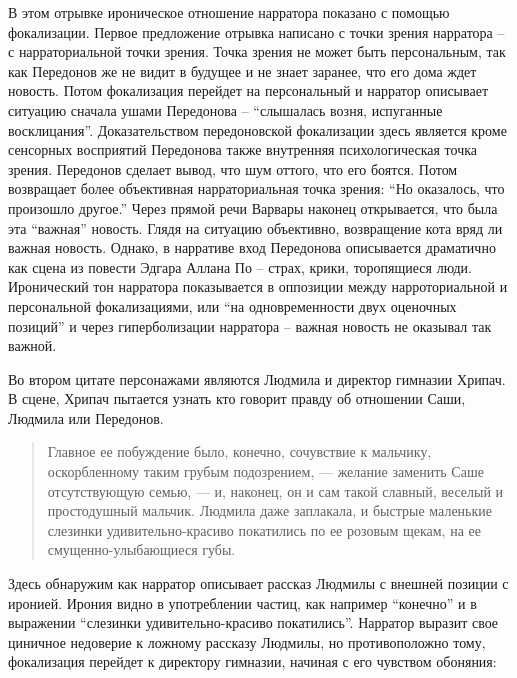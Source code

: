 \documentclass[12pt,a4paper]{article}
\begin{document}
В этом отрывке ироническое отношение нарратора показано с помощью фокализации. Первое предложение отрывка написано с точки зрения нарратора – с нарраториальной точки зрения. Точка зрения не может быть персональным, так как Передонов же не видит в будущее и не знает заранее, что его дома ждет новость. Потом фокализация перейдет на персональный и нарратор описывает ситуацию сначала ушами Передонова – \enquote{слышалась 
возня, испуганные восклицания}. Доказательством передоновской фокализации здесь является кроме сенсорных восприятий Передонова также внутренняя психологическая точка зрения. Передонов сделает вывод, что шум оттого, что его боятся. Потом возвращает более объективная нарраториальная точка зрения: \enquote{Но оказалось, что произошло другое.} Через прямой речи Варвары наконец открывается, что была эта \enquote{важная} новость.
Глядя на ситуацию объективно, возвращение кота вряд ли важная новость. Однако, в нарративе вход Передонова описывается драматично как сцена из повести Эдгара Аллана По – страх, крики, торопящиеся люди. Иронический тон нарратора показывается  в оппозиции между нарроториальной и персональной фокализациями, или \enquote{на одновременности двух оценочных позиций} и через гиперболизации нарратора – важная новость не оказывал так важной. 

Во втором цитате персонажами являются Людмила и директор гимназии Хрипач. В сцене, Хрипач пытается узнать кто говорит правду об отношении Саши, Людмила или Передонов. 

\begin{quote}
Главное ее побуждение было,
конечно, сочувствие к мальчику, оскорбленному таким грубым 
подозрением, — желание заменить Саше отсутствующую семью, — и, 
наконец, он и сам такой славный, веселый и простодушный мальчик. 
Людмила даже заплакала, и быстрые маленькие слезинки 
удивительно-красиво покатились по ее розовым щекам, на ее смущенно-улыбающиеся
губы. 

\parencite[239]{sologub2004}
\end{quote}

Здесь обнаружим как нарратор описывает рассказ Людмилы с внешней позиции с иронией. Ирония видно в употреблении частиц, как например \enquote{конечно} и в выражении \enquote{слезинки удивительно-красиво покатились}. Нарратор выразит свое циничное недоверие к ложному рассказу Людмилы, но противоположно тому, фокализация перейдет к директору гимназии, начиная с его чувством обоняния:
\end{document}

